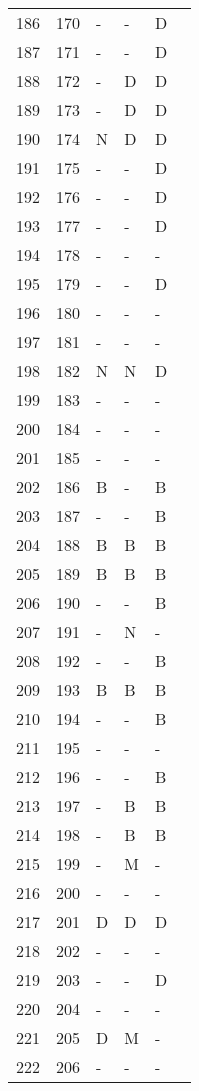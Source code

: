 \documentclass[10pt]{article}
\begin{document}
\begin{longtable}{llllll}
  186 & 170 & - & - & D &  \\ 
  187 & 171 & - & - & D &  \\ 
  188 & 172 & - & D & D &  \\ 
  189 & 173 & - & D & D &  \\ 
  190 & 174 & N & D & D &  \\ 
  191 & 175 & - & - & D &  \\ 
  192 & 176 & - & - & D &  \\ 
  193 & 177 & - & - & D &  \\ 
  194 & 178 & - & - & - &  \\ 
  195 & 179 & - & - & D &  \\ 
  196 & 180 & - & - & - &  \\ 
  197 & 181 & - & - & - &  \\ 
  198 & 182 & N & N & D &  \\ 
  199 & 183 & - & - & - &  \\ 
  200 & 184 & - & - & - &  \\ 
  201 & 185 & - & - & - &  \\ 
  202 & 186 & B & - & B &  \\ 
  203 & 187 & - & - & B &  \\ 
  204 & 188 & B & B & B &  \\ 
  205 & 189 & B & B & B &  \\ 
  206 & 190 & - & - & B &  \\ 
  207 & 191 & - & N & - &  \\ 
  208 & 192 & - & - & B &  \\ 
  209 & 193 & B & B & B &  \\ 
  210 & 194 & - & - & B &  \\ 
  211 & 195 & - & - & - &  \\ 
  212 & 196 & - & - & B &  \\ 
  213 & 197 & - & B & B &  \\ 
  214 & 198 & - & B & B &  \\ 
  215 & 199 & - & M & - &  \\ 
  216 & 200 & - & - & - &  \\ 
  217 & 201 & D & D & D &  \\ 
  218 & 202 & - & - & - &  \\ 
  219 & 203 & - & - & D &  \\ 
  220 & 204 & - & - & - &  \\ 
  221 & 205 & D & M & - &  \\ 
  222 & 206 & - & - & - &  \\ 

\end{longtable}
\end{document}
